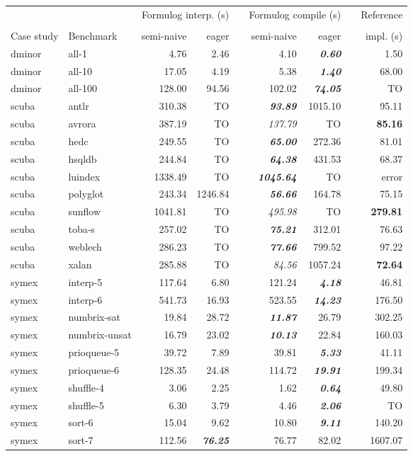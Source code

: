 \documentclass{article}
\begin{document}
\begin{tabular}{ll rr rrr rr}
\toprule
& & \multicolumn{2}{c}{Formulog interp. (s)} && \multicolumn{2}{c}{Formulog compile (s)} && Reference \\\\
\cline{3-4} \cline{6-7}
Case study & Benchmark & semi-naive & eager && semi-naive & eager && impl. (s) \\
\midrule
\rowcolor{Gray} dminor & all-1 & 4.76 & 2.46 && 4.10 & {\bf {\em 0.60}} && 1.50\\
\rowcolor{Gray} dminor & all-10 & 17.05 & 4.19 && 5.38 & {\bf {\em 1.40}} && 68.00\\
\rowcolor{Gray} dminor & all-100 & 128.00 & 94.56 && 102.02 & {\bf {\em 74.05}} && TO\\
scuba & antlr & 310.38 & TO && {\bf {\em 93.89}} & 1015.10 && 95.11\\
scuba & avrora & 387.19 & TO && {\em 137.79} & TO && {\bf 85.16}\\
scuba & hedc & 249.55 & TO && {\bf {\em 65.00}} & 272.36 && 81.01\\
scuba & hsqldb & 244.84 & TO && {\bf {\em 64.38}} & 431.53 && 68.37\\
scuba & luindex & 1338.49 & TO && {\bf {\em 1045.64}} & TO && error\\
scuba & polyglot & 243.34 & 1246.84 && {\bf {\em 56.66}} & 164.78 && 75.15\\
scuba & sunflow & 1041.81 & TO && {\em 495.98} & TO && {\bf 279.81}\\
scuba & toba-s & 257.02 & TO && {\bf {\em 75.21}} & 312.01 && 76.63\\
scuba & weblech & 286.23 & TO && {\bf {\em 77.66}} & 799.52 && 97.22\\
scuba & xalan & 285.88 & TO && {\em 84.56} & 1057.24 && {\bf 72.64}\\
\rowcolor{Gray} symex & interp-5 & 117.64 & 6.80 && 121.24 & {\bf {\em 4.18}} && 46.81\\
\rowcolor{Gray} symex & interp-6 & 541.73 & 16.93 && 523.55 & {\bf {\em 14.23}} && 176.50\\
\rowcolor{Gray} symex & numbrix-sat & 19.84 & 28.72 && {\bf {\em 11.87}} & 26.79 && 302.25\\
\rowcolor{Gray} symex & numbrix-unsat & 16.79 & 23.02 && {\bf {\em 10.13}} & 22.84 && 160.03\\
\rowcolor{Gray} symex & prioqueue-5 & 39.72 & 7.89 && 39.81 & {\bf {\em 5.33}} && 41.11\\
\rowcolor{Gray} symex & prioqueue-6 & 128.35 & 24.48 && 114.72 & {\bf {\em 19.91}} && 199.34\\
\rowcolor{Gray} symex & shuffle-4 & 3.06 & 2.25 && 1.62 & {\bf {\em 0.64}} && 49.80\\
\rowcolor{Gray} symex & shuffle-5 & 6.30 & 3.79 && 4.46 & {\bf {\em 2.06}} && TO\\
\rowcolor{Gray} symex & sort-6 & 15.04 & 9.62 && 10.80 & {\bf {\em 9.11}} && 140.20\\
\rowcolor{Gray} symex & sort-7 & 112.56 & {\bf {\em 76.25}} && 76.77 & 82.02 && 1607.07\\
\bottomrule
\end{tabular}
\end{document}
